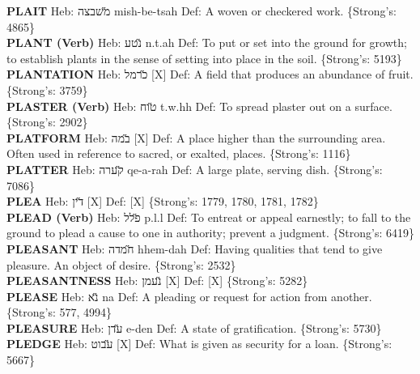 {\textbf{PLAIT} Heb: {\large\H משבצה} mish-be-tsah Def: A woven or checkered work. \{Strong's: 4865\}\hfill{}\\

\textbf{PLANT (Verb)} Heb: {\large\H נטע} n.t.ah Def: To put or set into the ground for growth; to establish plants in the sense of setting into place in the soil. \{Strong's: 5193\}\hfill{}\\

\textbf{PLANTATION} Heb: {\large\H כרמל} {[}X{]} Def: A field that produces an abundance of fruit. \{Strong's: 3759\}\hfill{}\\

\textbf{PLASTER (Verb)} Heb: {\large\H טוח} t.w.hh Def: To spread plaster out on a surface. \{Strong's: 2902\}\hfill{}\\

\textbf{PLATFORM} Heb: {\large\H במה} {[}X{]} Def: A place higher than the surrounding area. Often used in reference to sacred, or exalted, places. \{Strong's: 1116\}\hfill{}\\

\textbf{PLATTER} Heb: {\large\H קערה} qe-a-rah Def: A large plate, serving dish. \{Strong's: 7086\}\hfill{}\\

\textbf{PLEA} Heb: {\large\H דין} {[}X{]} Def: {[}X{]} \{Strong's: 1779, 1780, 1781, 1782\}\hfill{}\\

\textbf{PLEAD (Verb)} Heb: {\large\H פלל} p.l.l Def: To entreat or appeal earnestly; to fall to the ground to plead a cause to one in authority; prevent a judgment. \{Strong's: 6419\}\hfill{}\\

\textbf{PLEASANT} Heb: {\large\H חמדה} hhem-dah Def: Having qualities that tend to give pleasure. An object of desire. \{Strong's: 2532\}\hfill{}\\

\textbf{PLEASANTNESS} Heb: {\large\H נעמן} {[}X{]} Def: {[}X{]} \{Strong's: 5282\}\hfill{}\\

\textbf{PLEASE} Heb: {\large\H נא} na Def: A pleading or request for action from another. \{Strong's: 577, 4994\}\hfill{}\\

\textbf{PLEASURE} Heb: {\large\H עדן} e-den Def: A state of gratification. \{Strong's: 5730\}\hfill{}\\

\textbf{PLEDGE} Heb: {\large\H עבוט} {[}X{]} Def: What is given as security for a loan. \{Strong's: 5667\}\hfill{}\\

}
